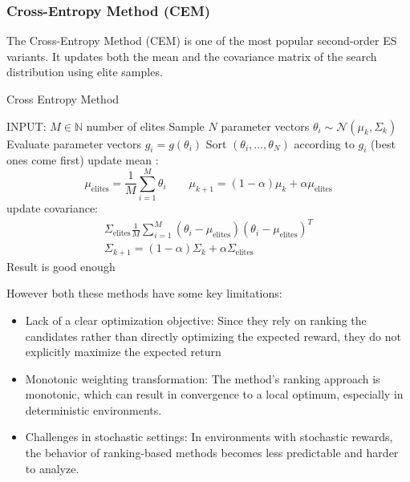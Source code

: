 \subsubsection{Cross-Entropy Method (CEM)}
The Cross-Entropy Method (CEM) is one of the most popular second-order ES variants. It updates both the mean and the 
covariance matrix of the search distribution using elite samples.
\begin{algorithm}[H]
   \large
    \caption{Cross Entropy Method}\label{cem}
    \begin{algorithmic}
    \STATE INPUT: $M \in \mathbb{N}$ number of elites 
    \REPEAT
    \STATE Sample $N$ parameter vectors $\theta_i\sim \mathcal{N}(\mu_k,\Sigma_k)$
    \STATE Evaluate parameter vectors $g_i = g(\theta_i)$
    \STATE Sort $(\theta_i,\dots,\theta_N)$ according to $g_i$ (best ones come first)
    \STATE update mean :
    $$\mu_\text{elites} = \frac{1}{M}\sum_{i=1}^M\theta_i \qquad \mu_{k+1} = (1-\alpha)\mu_k+ \alpha\mu_\text{elites}  $$
    \STATE update covariance: 
    \begin{gather*}
        \Sigma_\text{elites} \frac{1}{M}\sum_{i=1}^M (\theta_i -\mu_\text{elites})  (\theta_i -\mu_\text{elites})^T \\
        \Sigma_{k+1} = (1-\alpha)\Sigma_k + \alpha \Sigma_\text{elites}
    \end{gather*}
    \UNTIL Result is good enough
    \end{algorithmic}
\end{algorithm}
However both these methods have some key limitations:
\begin{itemize}
    \item Lack of a clear optimization objective: Since they rely on ranking the candidates rather than directly optimizing 
    the expected reward, they do not explicitly maximize the expected return
    \item Monotonic weighting transformation: The method's ranking approach is monotonic, which can result in convergence to a 
    local optimum, especially in deterministic environments.
    \item Challenges in stochastic settings: In environments with stochastic rewards, the behavior of ranking-based methods 
    becomes less predictable and harder to analyze.
\end{itemize}
 
